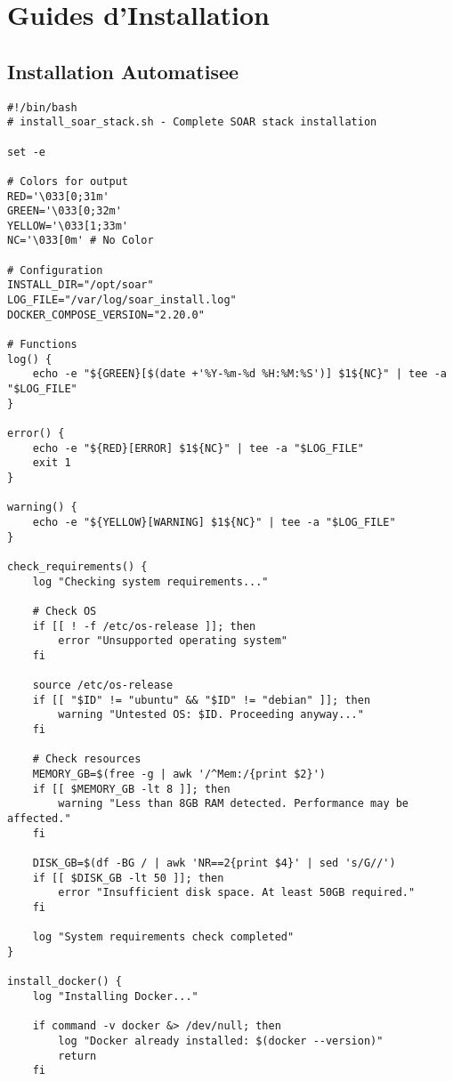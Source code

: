 \chapter{Guides d'Installation}

\section{Installation Automatisee}

\begin{lstlisting}[style=bashstyle,caption=Script d'installation complete de la stack SOAR]
#!/bin/bash
# install_soar_stack.sh - Complete SOAR stack installation

set -e

# Colors for output
RED='\033[0;31m'
GREEN='\033[0;32m'
YELLOW='\033[1;33m'
NC='\033[0m' # No Color

# Configuration
INSTALL_DIR="/opt/soar"
LOG_FILE="/var/log/soar_install.log"
DOCKER_COMPOSE_VERSION="2.20.0"

# Functions
log() {
    echo -e "${GREEN}[$(date +'%Y-%m-%d %H:%M:%S')] $1${NC}" | tee -a "$LOG_FILE"
}

error() {
    echo -e "${RED}[ERROR] $1${NC}" | tee -a "$LOG_FILE"
    exit 1
}

warning() {
    echo -e "${YELLOW}[WARNING] $1${NC}" | tee -a "$LOG_FILE"
}

check_requirements() {
    log "Checking system requirements..."
    
    # Check OS
    if [[ ! -f /etc/os-release ]]; then
        error "Unsupported operating system"
    fi
    
    source /etc/os-release
    if [[ "$ID" != "ubuntu" && "$ID" != "debian" ]]; then
        warning "Untested OS: $ID. Proceeding anyway..."
    fi
    
    # Check resources
    MEMORY_GB=$(free -g | awk '/^Mem:/{print $2}')
    if [[ $MEMORY_GB -lt 8 ]]; then
        warning "Less than 8GB RAM detected. Performance may be affected."
    fi
    
    DISK_GB=$(df -BG / | awk 'NR==2{print $4}' | sed 's/G//')
    if [[ $DISK_GB -lt 50 ]]; then
        error "Insufficient disk space. At least 50GB required."
    fi
    
    log "System requirements check completed"
}

install_docker() {
    log "Installing Docker..."
    
    if command -v docker &> /dev/null; then
        log "Docker already installed: $(docker --version)"
        return
    fi
    

\end{lstlisting}
